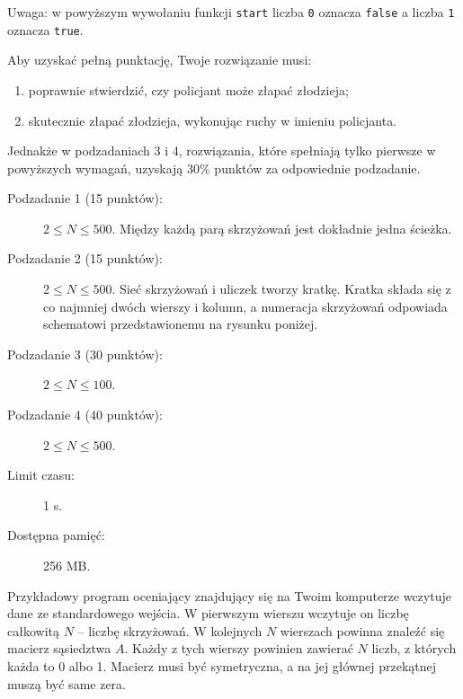 \documentclass{boi2014-pl}
\renewcommand{\method}[1]{{\tt #1}}
\newcommand{\constant}[1]{{\tt #1}}
\begin{document}
    Uwaga: w powyższym wywołaniu funkcji \method{start} liczba \constant{0} oznacza
    \constant{false} a liczba \constant{1} oznacza \constant{true}.

    \Scoring
    Aby uzyskać pełną punktację, Twoje rozwiązanie musi:
    \begin{enumerate}
      \item poprawnie stwierdzić, czy policjant może złapać złodzieja;
      \item skutecznie złapać złodzieja, wykonując ruchy w imieniu policjanta.
    \end{enumerate}
   
    Jednakże w podzadaniach 3 i 4, rozwiązania, które spełniają tylko pierwsze
    w powyższych wymagań, uzyskają 30\% punktów za odpowiednie podzadanie.

    \begin{description}
        \item[Podzadanie 1 (15 punktów):] $2 \le N \le 500$. Między każdą parą skrzyżowań jest dokładnie jedna ścieżka.
        \item[Podzadanie 2 (15 punktów):] $2 \le N \le 500$. Sieć skrzyżowań i uliczek tworzy kratkę.
        Kratka składa się z co najmniej dwóch wierszy i kolumn, a numeracja skrzyżowań
        odpowiada schematowi przedstawionemu na rysunku poniżej.
        \begin{figure}[h!]
           \centering
        \end{figure}
        \item[Podzadanie 3 (30 punktów):] $2 \le N \le 100$.
        \item[Podzadanie 4 (40 punktów):] $2 \le N \le 500$.
    \end{description}

    \Constraints
    
    \begin{description}
        \item[Limit czasu:] 1 s.
        \item[Dostępna pamięć:] 256 MB.
    \end{description}

    \Experimentation
    Przykładowy program oceniający znajdujący się na Twoim komputerze
    wczytuje dane ze standardowego wejścia.
    W pierwszym wierszu wczytuje on liczbę całkowitą $N$ -- liczbę skrzyżowań.
    W kolejnych $N$ wierszach powinna znaleźć się macierz sąsiedztwa $A$.
    Każdy z tych wierszy powinien zawierać $N$ liczb, z których każda to 0 albo 1.
    Macierz musi być symetryczna, a na jej głównej przekątnej muszą być same zera.
\end{document}
